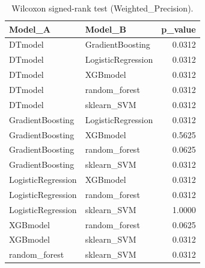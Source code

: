 \begin{table}[t]
\centering
\begin{tabular}{llr}
\toprule
Model_A & Model_B & p_value \\
\midrule
DTmodel & GradientBoosting & 0.0312 \\
DTmodel & LogisticRegression & 0.0312 \\
DTmodel & XGBmodel & 0.0312 \\
DTmodel & random_forest & 0.0312 \\
DTmodel & sklearn_SVM & 0.0312 \\
GradientBoosting & LogisticRegression & 0.0312 \\
GradientBoosting & XGBmodel & 0.5625 \\
GradientBoosting & random_forest & 0.0625 \\
GradientBoosting & sklearn_SVM & 0.0312 \\
LogisticRegression & XGBmodel & 0.0312 \\
LogisticRegression & random_forest & 0.0312 \\
LogisticRegression & sklearn_SVM & 1.0000 \\
XGBmodel & random_forest & 0.0625 \\
XGBmodel & sklearn_SVM & 0.0312 \\
random_forest & sklearn_SVM & 0.0312 \\
\bottomrule
\end{tabular}
\caption{Wilcoxon signed-rank test (Weighted_Precision).}
\label{tab:wilcoxon_Weighted_Precision}
\end{table}